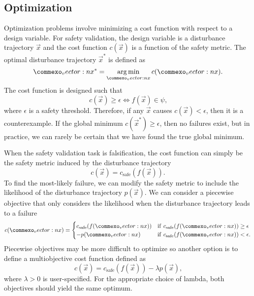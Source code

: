 \subsection{Optimization}

Optimization problems involve minimizing a cost function with respect to a design variable. For safety validation, the design variable is a disturbance trajectory $\vec{x}$ and the cost function $c(\vec{x})$ is a function of the safety metric. The optimal disturbance trajectory $\vec{x}^*$ is defined as
\begin{equation}
    \vec{x}^* = \argmin_{\vec{x}} c(\vec{x}) \text{.}
\end{equation}
The cost function is designed such that 
\begin{equation}
    c(\vec{x}) \geq \epsilon \iff f(\vec{x}) \in \psi \text{,}
\end{equation} 
where $\epsilon$ is a safety threshold. Therefore, if any $\vec{x}$ causes $c(\vec{x}) < \epsilon$, then it is a counterexample. If the global minimum $c(\vec{x}^*) \geq \epsilon$, then no failures exist, but in practice, we can rarely be certain that we have found the true global minimum. 

When the safety validation task is falsification, the cost function can simply be the safety metric induced by the disturbance trajectory
\begin{equation}
    c(\vec{x}) = c_{\text{safe}}(f(\vec{x})) \text{.}
\end{equation}
To find the most-likely failure, we can modify the safety metric to include the likelihood of the disturbance trajectory $p(\vec{x})$. We can consider a piecewise objective that only considers the likelihood when the disturbance trajectory leads to a failure
\begin{equation}
    c(\vec{x}) = \begin{cases}
        c_{\text{safe}}(f(\vec{x}))  & {\rm if} \ c_{\text{safe}}(f(\vec{x})) \geq \epsilon \\
        -p(\vec{x}) & {\rm if} \ c_{\text{safe}}(f(\vec{x})) < \epsilon \text{.}
    \end{cases}
\end{equation}
Piecewise objectives may be more difficult to optimize so another option is to define a multiobjective cost function defined as
\begin{equation}
    c(\vec{x}) = c_{\text{safe}}(f(\vec{x})) - \lambda p(\vec{x}) \text{,}
\end{equation}
where $\lambda > 0$ is user-specified. For the appropriate choice of lambda, both objectives should yield the same optimum. 


